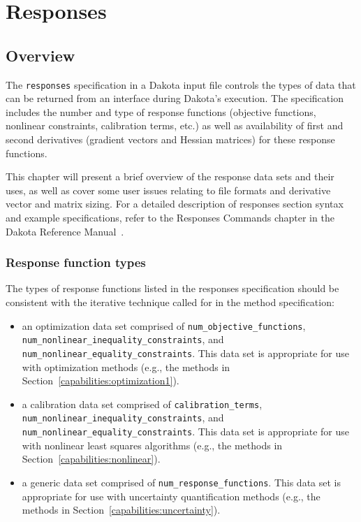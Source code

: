 \chapter{Responses}\label{responses}

\section{Overview}\label{responses:overview}

The \texttt{responses} specification in a Dakota input file controls
the types of data that can be returned from an interface during
Dakota's execution. The specification includes the number and type of
response functions (objective functions, nonlinear constraints, calibration 
terms, etc.) as well as availability of first and second
derivatives (gradient vectors and Hessian matrices) for these response
functions.

This chapter will present a brief overview of the response data sets
and their uses, as well as cover some user issues relating to file
formats and derivative vector and matrix sizing. For a detailed
description of responses section syntax and example specifications,
refer to the Responses Commands chapter in the Dakota Reference
Manual~\cite{RefMan}.

\subsection{Response function types}\label{responses:overview:types}

The types of response functions listed in the responses
specification should be consistent with the
iterative technique called for in the method specification:

\begin{itemize}

\item an optimization data set comprised of
  \texttt{num\_objective\_functions},\\
  \texttt{num\_nonlinear\_inequality\_constraints}, and
  \texttt{num\_nonlinear\_equality\_constraints}.  This data set is
  appropriate for use with optimization methods (e.g., the methods in
  Section~\ref{capabilities:optimization1}).
  
\item a calibration data set comprised of 
  \texttt{calibration\_terms},\\
  \texttt{num\_nonlinear\_inequality\_constraints}, and
  \texttt{num\_nonlinear\_equality\_constraints}.  This data set is
  appropriate for use with nonlinear least squares algorithms
  (e.g., the methods in Section~\ref{capabilities:nonlinear}).
  
\item a generic data set comprised of \texttt{num\_response\_functions}.  
  This data set is appropriate for use with uncertainty quantification
  methods (e.g., the methods in Section~\ref{capabilities:uncertainty}).
  
\end{itemize}

